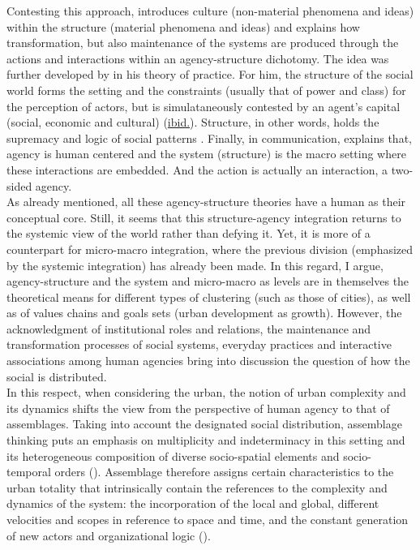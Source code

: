 \documentclass[11pt]{report}
\begin{document}
{{{Contesting this approach, \cite{archer_morphogenesis_1982} introduces culture (non-material phenomena and ideas) within the structure (material phenomena and ideas) and explains how transformation, but also maintenance of the systems are produced through the actions and interactions within  an agency-structure dichotomy.
The idea was further developed by \href{Bourdieu}{\cite{pierre_distinction-social_1979}} in his theory of practice.
For him, the structure of the social world forms the setting and the constraints (usually that of power and class) for the perception of actors, but is simulataneously contested by an agent's capital (social, economic and cultural) (\href{Bourdieu}{ibid.}).
Structure, in other words, holds the supremacy and logic of social patterns \href{Rafiee}{\cite{rafiee_relationship_2014}}.
Finally, in communication, \href{Habermas}{\cite{habermas_theory_1985}} explains that, agency is human centered and the system (structure) is the macro setting where these interactions are embedded. And the action is actually an interaction, a two-sided agency.
\\

As already mentioned, all these agency-structure theories have a human as their conceptual core. Still, it seems that this structure-agency integration returns to the systemic view of the world rather than defying it. Yet, it is more of a counterpart for micro-macro integration, where the previous division (emphasized by the systemic integration) has already been made. In this regard, I argue, agency-structure and the system and micro-macro as levels are in themselves the theoretical means for different types of clustering (such as those of cities), as well as of values chains and goals sets (urban development as growth). However, the acknowledgment of institutional roles and relations, the maintenance and transformation processes of social systems, everyday practices and interactive associations among human agencies bring into discussion the question of how the social is distributed.
\\

In this respect, when considering the urban, the notion of urban complexity and its dynamics shifts the view from the perspective of human agency to that of assemblages. Taking into account the designated social distribution, assemblage thinking puts an emphasis on multiplicity and indeterminacy in this setting and its heterogeneous composition of diverse socio-spatial elements and socio-temporal orders (\href{Anderson}{\citealt{anderson_assemblage_2011}}).
Assemblage therefore assigns certain characteristics to the urban totality that intrinsically contain the references to the complexity and dynamics of the system: the incorporation of the local and global, different velocities and scopes in reference to space and time, and the constant generation of new actors and organizational logic (\href{Sassen}{\citealt{sassen_sociology_2007}}).
\\

}}}
\end{document}
